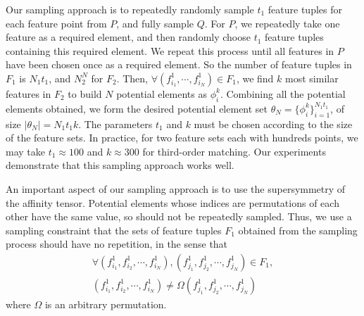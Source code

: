 Our sampling approach is to repeatedly randomly sample $t_1$ feature tuples for each feature point from $P$, and fully sample $Q$.
For $P$, we repeatedly take one feature as a required element, and then randomly choose $t_1$ feature tuples containing this required element.
We repeat this process until all features in $P$ have been chosen once as a required element.
So the number of feature tuples in $F_1$ is $N_1t_1$, and $N_2^N$ for $F_2$.
Then, $\forall (f_{i_1}^1, \cdots, f_{i_N}^1)\in F_1$, we find $k$ most similar features in $F_2$ to build $N$ potential elements as $\phi_i^k$.
Combining all the potential elements obtained, we form the desired potential element set $\theta_N = \{\phi_i^k\}_{i=1}^{N_1 t_1}$, of size $|\theta_N| = N_1 t_1 k$.
The parameters $t_1$ and $k$ must be chosen according to the size of the feature sets.
In practice, for two feature sets each with hundreds points,
we may take $t_1 \approx 100$ and $k\approx300$ for third-order matching.
Our experiments demonstrate that this sampling approach works well.

An important aspect of our sampling approach is to use the supersymmetry of the affinity tensor. Potential elements whose indices are permutations of each other
have the same value, so should not be repeatedly sampled.
Thus, we use a sampling constraint that the sets of feature tuples $F_1$ obtained from the sampling process should have no repetition, in the sense that
\begin{eqnarray}
\label{equ:noredun2}
\forall (f_{i_1}^1,f_{i_2}^1,\cdots,f_{i_N}^1),(f_{j_1}^1,f_{j_2}^1,\cdots,f_{j_N}^1) \in F_1,\nonumber\\ (f_{i_1}^1,f_{i_2}^1,\cdots,f_{i_N}^1)\neq\Omega(f_{j_1}^1,f_{j_2}^1,\cdots,f_{j_N}^1)
\end{eqnarray}
where $\Omega$ is an arbitrary permutation.

